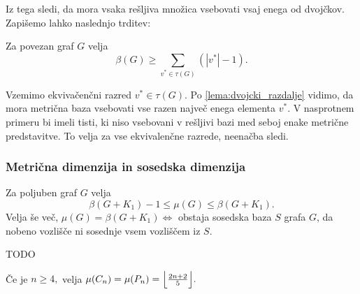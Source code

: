 \documentclass[mat1, tisk]{fmfdelo}
\newcommand{\1}{(1, 1, \ldots, 1)}
\newcommand{\2}{(2, 2, \ldots, 2)}
\begin{document}
Iz tega sledi, da mora vsaka rešljiva množica vsebovati vsaj enega od dvojčkov.
Zapišemo lahko naslednjo trditev:

\begin{trditev} \label{trd:meja_mdim_dvojcki}
    Za povezan graf $G$ velja
    $$\beta(G) \geq \sum_{v^{*} \in \tau(G)} (|v^{*}| - 1).$$
\end{trditev}

\begin{dokaz}
    Vzemimo ekvivačenčni razred $v^{*} \in \tau(G)$.
    Po \ref{lema:dvojcki_razdalje} vidimo, da mora metrična baza vsebovati vse razen 
    največ enega elementa $v^{*}$. V nasprotnem primeru bi imeli tisti, ki niso vsebovani v rešljivi 
    bazi med seboj enake metrične predstavitve.
    To velja za vse ekvivalenčne razrede, neenačba sledi. 
\end{dokaz}



\subsubsection{Metrična dimenzija in sosedska dimenzija} \label{ss:mdim_sdim}

\begin{trditev} \label{trd:meja_sdim}
    Za poljuben graf $G$ velja
    $$\beta(G + K_1) - 1 \leq \mu(G) \leq \beta(G + K_1).$$
    Velja še več, 
    $\mu(G) = \beta(G + K_1) \Leftrightarrow$ obstaja sosedska baza $S$ grafa $G$, 
    da nobeno vozlišče ni sosednje vsem vozliščem iz $S$.
\end{trditev}

\begin{dokaz}
    TODO
\end{dokaz}


\begin{trditev} \label{trd:sdim_pot_cikel}
    Če je $n \geq 4,$ velja $\mu(C_n) = \mu(P_n) = \Bigl \lfloor \frac{2n + 2}{5}\Bigr \rfloor. $
\end{trditev}
\end{document}
